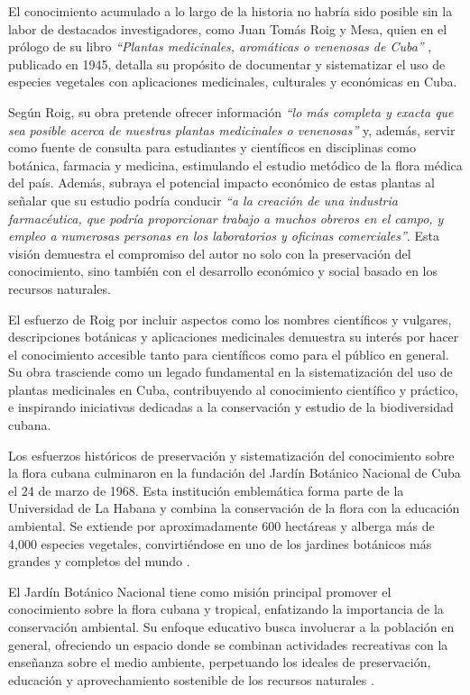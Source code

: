 El conocimiento acumulado a lo largo de la historia no habría sido posible sin la labor 
de destacados investigadores, como Juan Tomás Roig y Mesa, quien en el prólogo 
de su libro \textit{``Plantas medicinales, aromáticas o venenosas de Cuba''} \cite{Roig1945}, 
publicado en 1945, detalla su propósito de documentar y sistematizar el uso de especies 
vegetales con aplicaciones medicinales, culturales y económicas en Cuba. 

Según Roig, su obra pretende ofrecer información \textit{“lo más completa y exacta que sea posible acerca de nuestras plantas medicinales o venenosas”} 
y, además, servir como fuente de consulta para estudiantes y científicos en disciplinas como botánica, farmacia y medicina, 
estimulando el estudio metódico de la flora médica del país. Además, subraya el potencial impacto 
económico de estas plantas al señalar que su estudio podría conducir 
\textit{“a la creación de una industria farmacéutica, que podría proporcionar trabajo a muchos obreros en el campo, y empleo a numerosas personas en los laboratorios y oficinas comerciales”}. 
Esta visión demuestra el compromiso del autor no solo con la preservación del conocimiento, 
sino también con el desarrollo económico y social basado en los recursos naturales.

El esfuerzo de Roig por incluir aspectos como los nombres científicos y vulgares, 
descripciones botánicas y aplicaciones medicinales demuestra su interés por hacer 
el conocimiento accesible tanto para científicos como para el público en general. 
Su obra trasciende como un legado fundamental en la sistematización del uso de plantas 
medicinales en Cuba, contribuyendo al conocimiento científico y práctico, 
e inspirando iniciativas dedicadas a la conservación y estudio de la biodiversidad cubana.

Los esfuerzos históricos de preservación y sistematización del conocimiento sobre 
la flora cubana culminaron en la fundación del Jardín Botánico Nacional de Cuba 
el 24 de marzo de 1968. Esta institución emblemática forma parte de la 
Universidad de La Habana y combina la conservación de la flora con la educación 
ambiental. Se extiende por aproximadamente 600 hectáreas y alberga más de 4,000 
especies vegetales, convirtiéndose en uno de los jardines botánicos más grandes y 
completos del mundo \cite{EcuredJBNC}.

El Jardín Botánico Nacional tiene como misión principal promover el conocimiento 
sobre la flora cubana y tropical, enfatizando la importancia de la conservación 
ambiental. Su enfoque educativo busca involucrar a la población en general, 
ofreciendo un espacio donde se combinan actividades recreativas con la enseñanza 
sobre el medio ambiente, perpetuando los ideales de preservación, educación y 
aprovechamiento sostenible de los recursos naturales \cite{CadenaHabana2022}.

